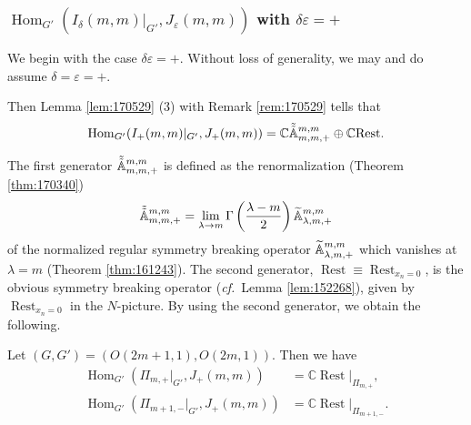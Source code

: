 \subsubsection
{${\operatorname{Hom}}_{G'}(I_{\delta}(m,m)|_{G'}, J_{\varepsilon}(m,m))$
 with $\delta \varepsilon=+$}
\label{subsec:IJmm+}
We begin with the case $\delta\varepsilon =+$.  
Without loss of generality,
 we may and do assume $\delta=\varepsilon=+$.  



Then Lemma \ref{lem:170529} (3) 
 with Remark \ref{rem:170529} tells that 
\begin{equation}
\label{eqn:IJmm}
{\operatorname{Hom}}_{G'}(I_{+}(m,m)|_{G'}, 
                          J_{+}(m,m))
=
{\mathbb{C}} \tilde{\tilde{{\mathbb{A}}}}_{{m},{m},{+}}^{{m,m}}
\oplus
{\mathbb{C}} {\operatorname{Rest}}.  
\end{equation}



The first generator $\tilde{\tilde{{\mathbb{A}}}}_{{m},{m},{+}}^{{m,m}}$ is defined
 as the renormalization (Theorem \ref{thm:170340})
\begin{equation}
\label{eqn:Amm2tilde}
\tilde{\tilde{{\mathbb{A}}}}_{{m},{m},{+}}^{{m,m}}
=
\lim_{\lambda \to m}
\Gamma\left(\frac {\lambda-m}{2}\right)
{\widetilde{\mathbb{A}}}_{{\lambda},{m},{+}}^{{m,m}}
\end{equation}
of the normalized regular symmetry breaking operator
 ${\widetilde{\mathbb{A}}}_{{\lambda},{m},{+}}^{{m,m}}$
 which vanishes at $\lambda=m$
 (Theorem \ref{thm:161243}).  
The second generator,
 ${\operatorname{Rest}}\equiv {\operatorname{Rest}}_{x_n=0}$, 
 is the obvious symmetry breaking operator
({\it{cf.}}~Lemma \ref{lem:152268}), 
 given by ${\operatorname{Rest}}_{x_n=0}$
 in the $N$-picture.  
By using the second generator,
 we obtain the following.  



\begin{proposition}
\label{prop:IJmmbase}
Let $(G,G')=(O(2m+1,1),O(2m,1))$.  
Then we have 
\begin{align*}
{\operatorname{Hom}}_{G'}(\Pi_{m,+}|_{G'},J_+(m,m))
&=
{\mathbb{C}} {\operatorname{Rest}}|_{\Pi_{m,+}}, 
\\
{\operatorname{Hom}}_{G'}(\Pi_{m+1,-}|_{G'},J_+(m,m))
&=
{\mathbb{C}} {\operatorname{Rest}}|_{\Pi_{m+1,-}}.  
\end{align*}
\end{proposition}

